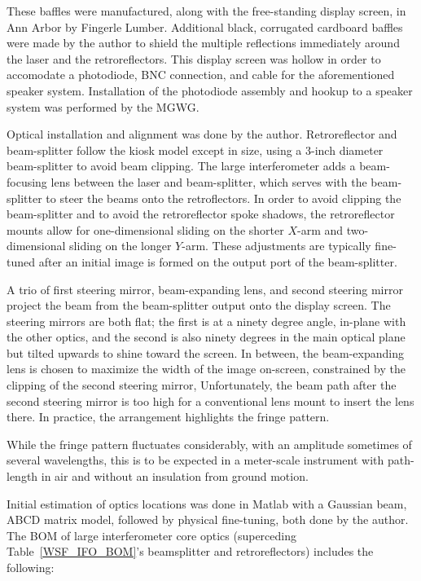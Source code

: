 These baffles were manufactured, along with the free-standing display screen, in Ann Arbor by Fingerle Lumber.
Additional black, corrugated cardboard baffles were made by the author to shield the multiple reflections immediately around the laser and the retroreflectors.
This display screen was hollow in order to accomodate a photodiode, BNC connection, and cable for the aforementioned speaker system.
Installation of the photodiode assembly and hookup to a speaker system was performed by the MGWG.

Optical installation and alignment was done by the author.
Retroreflector and beam-splitter follow the kiosk model except in size, using a 3-inch diameter beam-splitter to avoid beam clipping.
The large interferometer adds a beam-focusing lens between the laser and beam-splitter, which serves with the beam-splitter to steer the beams onto the retroflectors.
In order to avoid clipping the beam-splitter and to avoid the retroreflector spoke shadows, the retroreflector mounts allow for one-dimensional sliding on the shorter $X$-arm and two-dimensional sliding on the longer $Y$-arm.
These adjustments are typically fine-tuned after an initial image is formed on the output port of the beam-splitter.

A trio of first steering mirror, beam-expanding lens, and second steering mirror project the beam from the beam-splitter output onto the display screen.
The steering mirrors are both flat; the first is at a ninety degree angle, in-plane with the other optics, and the second is also ninety degrees in the main optical plane but tilted upwards to shine toward the screen.
In between, the beam-expanding lens is chosen to maximize the width of the image on-screen, constrained by the clipping of the second steering mirror,
Unfortunately, the beam path after the second steering mirror is too high for a conventional lens mount to insert the lens there.
In practice, the arrangement highlights the fringe pattern.

While the fringe pattern fluctuates considerably, with an amplitude sometimes of several wavelengths, this is to be expected in a meter-scale instrument with path-length in air and without an insulation from ground motion.

Initial estimation of optics locations was done in Matlab with a Gaussian beam, ABCD matrix model, followed by physical fine-tuning, both done by the author.
The BOM of large interferometer core optics (superceding Table~\ref{WSF_IFO_BOM}'s beamsplitter and retroreflectors) includes the following:

